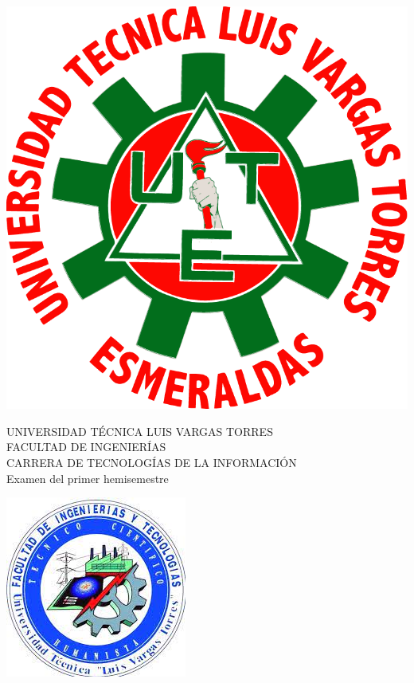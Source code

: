 \documentclass[12pt]{exam}
\begin{document}
\thispagestyle{headandfoot}


\begin{minipage}[H]{0.10\linewidth}
  \flushleft
  \includegraphics[scale=0.12]{logoutlvte}
\end{minipage}
\begin{minipage}[H]{0.70\linewidth}
  \begin{center}
    UNIVERSIDAD TÉCNICA LUIS VARGAS TORRES\\  FACULTAD DE INGENIERÍAS\\
    CARRERA DE TECNOLOGÍAS DE LA INFORMACIÓN \\ Examen del primer hemisemestre
  \end{center}
\end{minipage}
\begin{minipage}[H]{0.10\linewidth}
    \flushleft
    \includegraphics[scale=0.3]{logofit}
\end{minipage}
\end{document}
